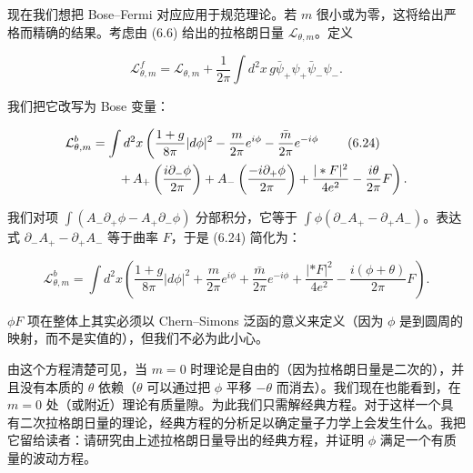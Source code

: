 现在我们想把 Bose–Fermi 对应应用于规范理论。若 $m$ 很小或为零，这将给出严格而精确的结果。考虑由 (6.6) 给出的拉格朗日量 $\mathcal{L}_{\theta,m}$。定义

\begin{equation}
  \tag{6.23}
  \label{eq:6-23}
  \mathcal{L}^f_{\theta,m}=\mathcal{L}_{\theta,m}+\frac{1}{2\pi}\int d^2x\,g\bar\psi_+\psi_+\bar\psi_-\psi_-.
\end{equation}

我们把它改写为 Bose 变量：

\begin{align}
  \mathcal{L}^b_{\theta,m} & =\int d^2x\left(\frac{1+g}{8\pi}|d\phi|^2-\frac{m}{2\pi}e^{i\phi}-\frac{\bar m}{2\pi}e^{-i\phi}\right. \tag{6.24}\label{eq:6-24}\\
  & \qquad\left.+\,A_+\left(\frac{i\partial_-\phi}{2\pi}\right)+A_-\left(\frac{-i\partial_+\phi}{2\pi}\right)+\frac{|\ast F|^2}{4e^2}-\frac{i\theta}{2\pi}F\right).\notag
\end{align}

我们对项 $\int(A_-\partial_+\phi-A_+\partial_-\phi)$ 分部积分，它等于 $\int\phi(\partial_-A_+-\partial_+A_-)$。表达式 $\partial_-A_+-\partial_+A_-$ 等于曲率 $F$，于是 (6.24) 简化为：

\begin{equation}
  \tag{6.25}
  \label{eq:6-25}
  \mathcal{L}^b_{\theta,m}=\int d^2x\left(\frac{1+g}{8\pi}|d\phi|^2+\frac{m}{2\pi}e^{i\phi}+\frac{\bar m}{2\pi}e^{-i\phi}+\frac{|\ast F|^2}{4e^2}-\frac{i(\phi+\theta)}{2\pi}F\right).
\end{equation}


$\phi F$ 项在整体上其实必须以 Chern–Simons 泛函的意义来定义（因为 $\phi$ 是到圆周的映射，而不是实值的），但我们不必为此小心。

由这个方程清楚可见，当 $m=0$ 时理论是自由的（因为拉格朗日量是二次的），并且没有本质的 $\theta$ 依赖（$\theta$ 可以通过把 $\phi$ 平移 $-\theta$ 而消去）。我们现在也能看到，在 $m=0$ 处（或附近）理论有质量隙。为此我们只需解经典方程。对于这样一个具有二次拉格朗日量的理论，经典方程的分析足以确定量子力学上会发生什么。我把它留给读者：请研究由上述拉格朗日量导出的经典方程，并证明 $\phi$ 满足一个有质量的波动方程。

